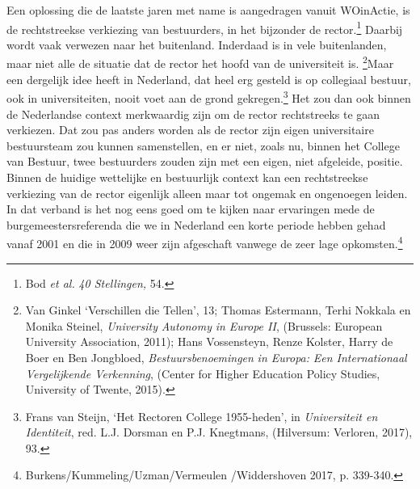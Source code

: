 \documentclass[smallauthor, chapterhaspagenum, nochapterinheader, pagenuminheader,  bigchapnum,medium2, tocpages,  garamond, titleinheader]{jote-book}
\begin{document}
	Een oplossing die de laatste jaren met name is aangedragen vanuit WOinActie, is de rechtstreekse verkiezing van bestuurders, in het bijzonder de rector.\footnote{Bod \emph{et al.} \emph{40 Stellingen,} 54.} Daarbij wordt vaak verwezen naar het buitenland. Inderdaad is in vele buitenlanden, maar niet alle de situatie dat de rector het hoofd van de universiteit is.\textsuperscript{ }\footnote{Van Ginkel ‘Verschillen die Tellen', 13; Thomas Estermann, Terhi Nokkala en Monika Steinel, \emph{University }\emph{Autonomy}\emph{ in Europe II}, (Brussels: European University Association, 2011); Hans Vossensteyn, Renze Kolster, Harry de Boer en Ben Jongbloed, \emph{Bestuursbenoemingen}\emph{ in Europa:}\emph{ }\emph{Een Internationaal Vergelijkende Verkenning}, (Center for Higher Education Policy Studies, University of Twente, 2015).}Maar een dergelijk idee heeft in Nederland, dat heel erg gesteld is op collegiaal bestuur, ook in universiteiten, nooit voet aan de grond gekregen.\footnote{Frans van Steijn, ‘Het Rectoren College 1955-heden', in \emph{Universiteit en Identiteit}, red. L.J. Dorsman en P.J. Knegtmans, (Hilversum: Verloren, 2017), 93.} Het zou dan ook binnen de Nederlandse context merkwaardig zijn om de rector rechtstreeks te gaan verkiezen. Dat zou pas anders worden als de rector zijn eigen universitaire bestuursteam zou kunnen samenstellen, en er niet, zoals nu, binnen het College van Bestuur, twee bestuurders zouden zijn met een eigen, niet afgeleide, positie. Binnen de huidige wettelijke en bestuurlijk context kan een rechtstreekse verkiezing van de rector eigenlijk alleen maar tot ongemak en ongenoegen leiden. In dat verband is het nog eens goed om te kijken naar ervaringen mede de burgemeestersreferenda die we in Nederland een korte periode hebben gehad vanaf 2001 en die in 2009 weer zijn afgeschaft vanwege de zeer lage opkomsten.\footnote{Burkens/Kummeling/Uzman/Vermeulen /Widdershoven 2017, p. 339-340.}
\end{document}
